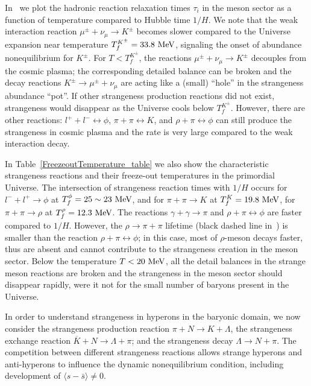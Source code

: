 In~ we plot the hadronic reaction relaxation times $\tau_{i}$ in the meson sector as a function of temperature compared to Hubble time $1/H$. We note that the weak interaction reaction $\mu^\pm+\nu_{\mu}\rightarrow K^\pm$ becomes slower compared to the Universe expansion near temperature $T_f^{K^\pm}=33.8\text{ MeV}$, signaling the onset of abundance nonequilibrium for $K^\pm$. For $T<T_f^{K^\pm}$, the reactions $\mu^\pm+\nu_{\mu}\rightarrow K^\pm$ decouples from the cosmic plasma; the corresponding detailed balance can be broken and the decay reactions $K^\pm\rightarrow\mu^\pm+\nu_{\mu}$ are acting like a (small) ``hole'' in the strangeness abundance ``pot''. If other strangeness production reactions did not exist, strangeness would disappear as the Universe cools below $T_f^{K^\pm}$. However, there are other reactions: $l^++l^-\leftrightarrow\phi$, $\pi+\pi\leftrightarrow K$, and $\rho+\pi\leftrightarrow\phi$ can still produce the strangeness in cosmic plasma and the rate is very large compared to the weak interaction decay.

In Table~\ref{FreezeoutTemperature_table} we also show the characteristic strangeness reactions and their freeze-out temperatures in the primordial Universe. The intersection of strangeness reaction times with $1/H$ occurs for $l^-+l^+\rightarrow\phi$ at $T_f^\phi=25\sim23\text{ MeV}$, and for $\pi+\pi\rightarrow K$ at $T_f^K=19.8\text{ MeV}$, for $\pi+\pi\rightarrow\rho$ at $T_f^\rho=12.3\text{ MeV}$. The reactions $\gamma+\gamma\rightarrow\pi$ and $\rho+\pi\leftrightarrow\phi$ are faster compared to $1/H$. However, the $\rho\to\pi+\pi$ lifetime (black dashed line in~) is smaller than the reaction $\rho+\pi\leftrightarrow\phi$; in this case, most of $\rho$-meson decays faster, thus are absent and cannot contribute to the strangeness creation in the meson sector. Below the temperature $T<20\text{ MeV}$, all the detail balances in the strange meson reactions are broken and the strangeness in the meson sector should disappear rapidly, were it not for the small number of baryons present in the Universe.

In order to understand strangeness in hyperons in the baryonic domain, we now consider the strangeness production reaction $\pi +N\rightarrow K+\Lambda$, the strangeness exchange reaction $\overline{K}+N\rightarrow \Lambda+\pi$; and the strangeness decay $\Lambda\rightarrow N+\pi$. The competition between different strangeness reactions allows strange hyperons and anti-hyperons to influence the dynamic nonequilibrium condition, including development of $\langle s-\bar s\rangle \ne 0$.

